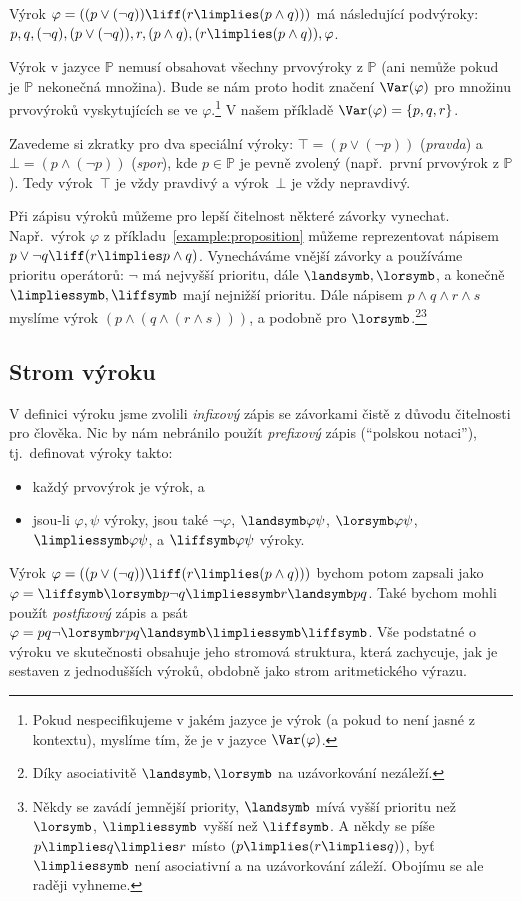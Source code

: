 \begin{example}\label{example:proposition}
Výrok $\varphi = ((p\lor (\neg q)) \liff (r\limplies (p \land q)))$ má následující podvýroky: $p, q, (\neg q), (p\lor (\neg q)), r, (p\land q), (r\limplies (p \land q)), \varphi$.
\end{example}

Výrok v jazyce $\mathbb P$ nemusí obsahovat všechny prvovýroky z $\mathbb P$ (ani nemůže pokud je $\mathbb P$ nekonečná množina). Bude se nám proto hodit značení $\Var(\varphi)$ pro množinu prvovýroků vyskytujících se ve $\varphi$.\footnote{Pokud nespecifikujeme v jakém jazyce je výrok (a pokud to není jasné z kontextu), myslíme tím, že je v jazyce $\Var(\varphi)$.} V našem příkladě $\Var(\varphi)=\{p,q,r\}$.

Zavedeme si zkratky pro dva speciální výroky: $\top=(p\lor(\neg p))$ (\emph{pravda}) a $\bot=(p\land(\neg p))$ (\emph{spor}), kde $p\in\mathbb P$ je pevně zvolený (např.\ první prvovýrok z $\mathbb P$). Tedy výrok~$\top$ je vždy pravdivý a výrok~$\bot$ je vždy nepravdivý.


Při zápisu výroků můžeme pro lepší čitelnost některé závorky vynechat. Např.\ výrok $\varphi$ z příkladu~\ref{example:proposition} můžeme reprezentovat nápisem
$p\lor \neg q \liff (r\limplies p \land q)$. Vynecháváme vnější závorky a používáme prioritu operátorů: $\neg$ má nejvyšší prioritu, dále $\landsymb,\lorsymb$, a konečně $\limpliessymb,\liffsymb$ mají nejnižší prioritu. Dále nápisem $p\land q\land r\land s$ myslíme výrok $(p\land (q\land (r \land s)))$, a podobně pro $\lorsymb$.\footnote{Díky asociativitě $\landsymb,\lorsymb$ na uzávorkování nezáleží.}\footnote{Někdy se zavádí jemnější priority, $\landsymb$ mívá vyšší prioritu než $\lorsymb$,  $\limpliessymb$ vyšší než $\liffsymb$. A někdy se píše $p\limplies q\limplies r$ místo $(p\limplies (r\limplies q))$, byť $\limpliessymb$ není asociativní a na uzávorkování záleží. Obojímu se ale raději vyhneme.}


\subsection{Strom výroku}

V definici výroku jsme zvolili \emph{infixový} zápis se závorkami čistě z důvodu čitelnosti pro člověka. Nic by nám nebránilo použít \emph{prefixový} zápis (``polskou notaci''), tj.\ definovat výroky takto:
\begin{itemize}
    \item každý prvovýrok je výrok, a
    \item jsou-li $\varphi,\psi$ výroky, jsou také $\neg \varphi$, $\landsymb \varphi \psi$, $\lorsymb \varphi \psi$, $\limpliessymb \varphi \psi$, a $\liffsymb \varphi \psi$ výroky.
\end{itemize}
Výrok $\varphi=((p\lor (\neg q)) \liff (r\limplies (p \land q)))$ bychom potom zapsali jako $\varphi=\liffsymb \lorsymb p \neg q \limpliessymb r \landsymb p q$. Také bychom mohli použít \emph{postfixový} zápis a psát $\varphi=p q \neg \lorsymb r p q \landsymb \limpliessymb \liffsymb$. Vše podstatné o výroku ve skutečnosti obsahuje jeho stromová struktura, která zachycuje, jak je sestaven z jednodušších výroků, obdobně jako strom aritmetického výrazu.

